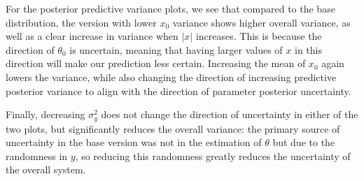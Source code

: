 \documentclass[11pt]{article} %
\begin{document}
\begin{enumerate}
For the posterior predictive variance plots, we see that compared to the base distribution, the version with lower $x_0$ variance shows higher overall variance,
as well as a clear increase in variance when $|x|$ increases. This is because the direction of $\theta_0$ is uncertain, meaning that having larger values of $x$
in this direction will make our prediction less certain. Increasing the mean of $x_0$ again lowers the variance, while also changing the direction of increasing
predictive posterior variance to align with the direction of parameter posterior uncertainty.

Finally, decreasing $\sigma_y^2$ does not change the direction of uncertainty in either of the two plots, but significantly reduces the overall variance:
the primary source of uncertainty in the base version was not in the estimation of $\theta$ but due to the randomness in $y$, so reducing this randomness
greatly reduces the uncertainty of the overall system.


\end{enumerate}
\end{document}
